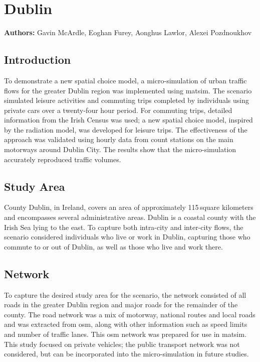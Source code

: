 \section{Dublin}
\label{sec:dublin}
\hfill \textbf{Authors:} Gavin McArdle, Eoghan Furey, Aonghus Lawlor, Alexei Pozdnoukhov


\subsection{Introduction}
To demonstrate a new spatial choice model, a micro-simulation of urban traffic flows for the greater Dublin region was implemented using \gls{matsim}. The scenario simulated leisure activities and commuting trips completed by individuals using private cars over a twenty-four hour period. For commuting trips, detailed information from the Irish Census was used; a new spatial choice model, inspired by the radiation model, was developed for leisure trips. The effectiveness of the approach was validated using hourly data from count stations on the main motorways around Dublin City. The results show that the micro-simulation accurately reproduced traffic volumes.

\subsection{Study Area}
County Dublin, in Ireland, covers an area of approximately 115\,square kilometers and encompasses several administrative areas. Dublin is a coastal county with the Irish Sea lying to the east. To capture both intra-city and inter-city flows, the scenario considered individuals who live or work in Dublin, capturing those who commute to or out of Dublin, as well as those who live and work there.

\subsection{Network}
To capture the desired study area for the scenario, the network consisted of all roads in the greater Dublin region and major roads for the remainder of the county. The road network was a mix of motorway, national routes and local roads and was extracted from \gls{osm}, along with other information such as speed limits and number of traffic lanes. This \gls{osm} network was prepared for use in \gls{matsim}.  This study focused on private vehicles; the public transport network was not considered, but can be incorporated into the micro-simulation in future studies.

